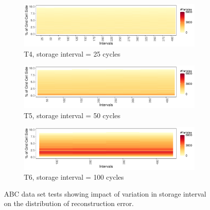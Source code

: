 \begin{figure}[!ht]
\begin{subfigure}{\linewidth}
\centering
\includegraphics[width=0.95\linewidth]{Images/ABC_Intervals_T4.pdf}
\caption{T4, storage interval = 25 cycles}
\label{fig:abc_4}
\end{subfigure}
\begin{subfigure}{\linewidth}
\centering
\includegraphics[width=0.95\linewidth]{Images/ABC_Intervals_T5.pdf}
\caption{T5, storage interval = 50 cycles}
\label{fig:abc_5}
\end{subfigure}
\begin{subfigure}{\linewidth}
\centering
\includegraphics[width=0.95\linewidth]{Images/ABC_Intervals_T6.pdf}
\caption{T6, storage interval = 100 cycles}
\label{fig:abc_6}
\end{subfigure}
\caption{ABC data set tests showing impact of variation in storage interval on the distribution of reconstruction error.}
\label{fig:abc_map}
\end{figure}
